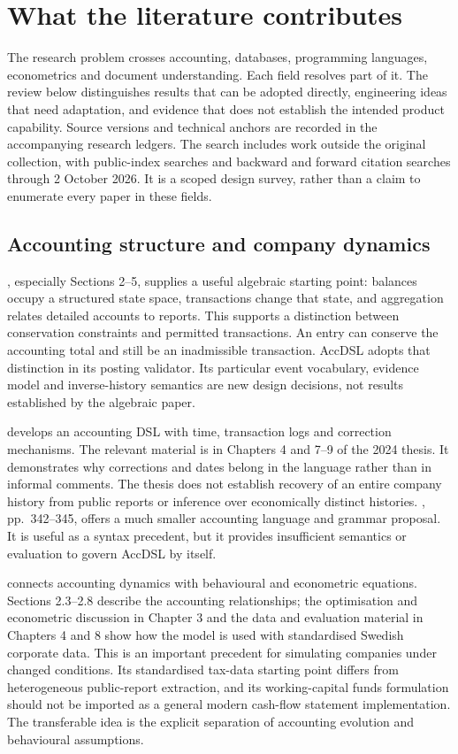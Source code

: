 \chapter{What the literature contributes}
\label{ch:literature}

The research problem crosses accounting, databases, programming languages,
econometrics and document understanding. Each field resolves part of it. The
review below distinguishes results that can be adopted directly, engineering
ideas that need adaptation, and evidence that does not establish the intended
product capability. Source versions and technical anchors are recorded in the
accompanying research ledgers. The search includes work outside the original
collection, with public-index searches and backward and forward citation
searches through 2 October 2026. It is a scoped design survey, rather than a
claim to enumerate every paper in these fields.

\section{Accounting structure and company dynamics}

\citet{nehmer1997}, especially Sections 2--5, supplies a useful algebraic
starting point: balances occupy a structured state space, transactions change
that state, and aggregation relates detailed accounts to reports. This supports
a distinction between conservation constraints and permitted transactions.
An entry can conserve the accounting total and still be an inadmissible
transaction. AccDSL adopts that distinction in its posting validator. Its
particular event vocabulary, evidence model and inverse-history semantics are
new design decisions, not results established by the algebraic paper.

\citet{doshi2024} develops an accounting DSL with time, transaction logs and
correction mechanisms. The relevant material is in Chapters 4 and 7--9 of the
2024 thesis.
It demonstrates why corrections and dates belong in the language rather than
in informal comments. The thesis does not establish recovery of an entire
company history from public reports or inference over economically distinct
histories. \citet{babcinetchi2022}, pp.~342--345, offers a much smaller accounting
language and grammar proposal. It is useful as a syntax precedent, but it
provides insufficient semantics or evaluation to govern AccDSL by itself.

\citet{shahnazarian2004} connects accounting dynamics with behavioural and
econometric equations. Sections 2.3--2.8 describe the accounting relationships;
the optimisation and econometric discussion in Chapter 3 and the data and
evaluation material in Chapters 4 and 8 show how the model is used with
standardised Swedish corporate data. This is an important precedent for
simulating companies under changed conditions. Its standardised tax-data
starting point differs from heterogeneous public-report extraction, and its
working-capital funds formulation should not be imported as a general modern
cash-flow statement implementation. The transferable idea is the explicit
separation of accounting evolution and behavioural assumptions.

